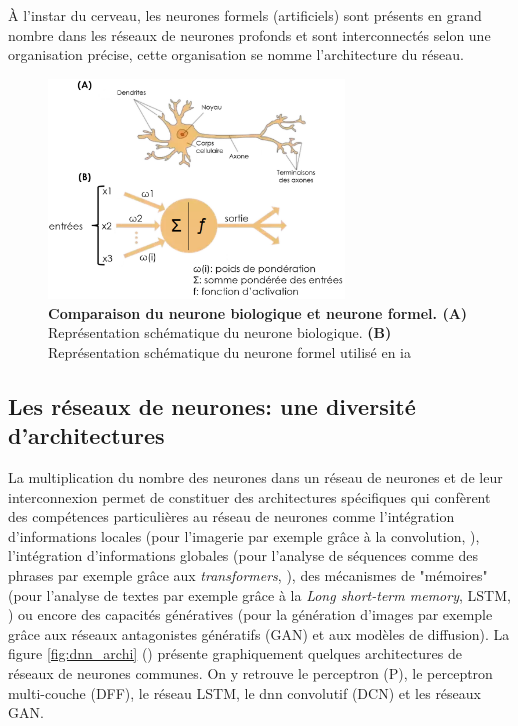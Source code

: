 À l'instar du cerveau, les neurones formels (artificiels) sont présents en grand nombre dans les réseaux de neurones profonds et sont interconnectés selon une organisation précise, cette organisation se nomme l'architecture du réseau.
\begin{figure}[!ht]
 \centering
 \includegraphics[width=0.7\textwidth]{figures/neuronne.png}
 \caption[Comparaison du neurone biologique et du neurone formel]{\textbf{Comparaison du neurone biologique et neurone formel. (A)} Représentation schématique du neurone biologique. \textbf{(B)} Représentation schématique du neurone formel utilisé en \gls{ia}}
 \label{fig:neurons}
\end{figure}
\subsection{Les réseaux de neurones: une diversité d'architectures}
La multiplication du nombre des neurones dans un réseau de neurones et de leur interconnexion permet de constituer des architectures spécifiques qui confèrent des compétences particulières au réseau de neurones comme l'intégration d'informations locales (pour l'imagerie par exemple grâce à la convolution, \cite{fukushima_neocognitron_1980}), l'intégration d'informations globales (pour l'analyse de séquences comme des phrases par exemple grâce aux \textit{transformers}, \cite{vaswani_attention_2017}), des mécanismes de "mémoires" (pour l'analyse de textes par exemple grâce à la \textit{Long short-term memory}, LSTM, \cite{hochreiter_long_1997}) ou encore des capacités génératives (pour la génération d'images par exemple grâce aux réseaux antagonistes génératifs (GAN) et aux modèles de diffusion). La figure \ref{fig:dnn_archi} (\cite{leijnen_neural_2016}) présente graphiquement quelques architectures de réseaux de neurones communes. On y retrouve le perceptron (P), le perceptron multi-couche (DFF), le réseau LSTM, le \gls{dnn} convolutif (DCN) et les réseaux GAN.


